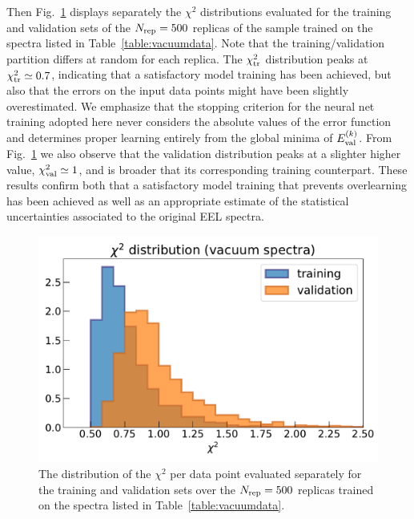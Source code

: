Then Fig.~\ref{fig:chi2_distributions} displays separately the $\chi^2$  distributions
evaluated for the training and validation sets
of the $N_{\rm rep}=500$ replicas of the sample trained on the spectra
listed in Table~\ref{table:vacuumdata}.
%
Note that the training/validation partition differs at random for each replica.
%
The $\chi^2_{\rm tr}$ distribution peaks at $\chi^2_{\rm tr}\simeq 0.7$,
indicating that a satisfactory model training
has been achieved, but also that the errors on the input data points might have
been slightly overestimated.
%
We emphasize that the stopping criterion for the neural net training adopted here never considers
the absolute values of the error function and determines proper learning entirely from
the global minima of $E_{\rm val}^{(k)}$.
%
From Fig.~\ref{fig:chi2_distributions} we also observe that  the validation
distribution peaks at
a slighter higher value, $\chi^2_{\rm val}\simeq 1$, and
is broader that its corresponding training counterpart.
%
These results confirm both that a satisfactory model training that prevents overlearning
has been achieved as well as an appropriate estimate of the statistical uncertainties
associated to the original EEL spectra.

\begin{figure}[t]
    \centering
    \includegraphics[width=120mm]{plots/chi2_distributions.pdf}
    \caption{\small The distribution of the $\chi^2$ per data point evaluated
      separately for the training and validation sets over
      the $N_{\rm rep}=500$ replicas trained on the spectra
      listed in Table~\ref{table:vacuumdata}.}
    \label{fig:chi2_distributions}
\end{figure}

